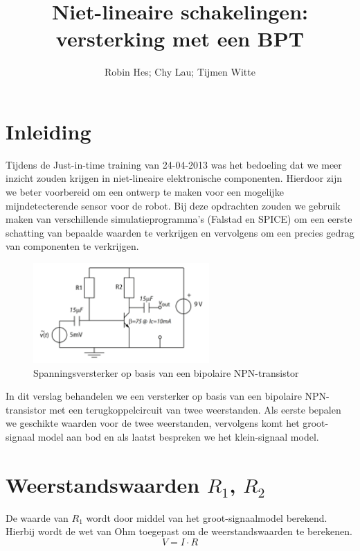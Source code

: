 \documentclass{report}
\title{Niet-lineaire schakelingen: versterking met een BPT}
\author{Robin Hes; Chy Lau; Tijmen Witte}
\begin{document}
\maketitle
\tableofcontents

\chapter{Inleiding}

Tijdens de Just-in-time training van 24-04-2013 was het bedoeling dat we meer inzicht zouden krijgen in niet-lineaire elektronische componenten. Hierdoor 
zijn we beter voorbereid om een ontwerp te maken voor een mogelijke mijndetecterende sensor voor de robot. Bij deze opdrachten zouden we gebruik maken van verschillende simulatieprogramma's (Falstad en SPICE) om een eerste schatting van bepaalde waarden te verkrijgen en vervolgens om een precies gedrag van componenten te verkrijgen.

\begin{figure}[H]
	\centering
	\label{fig:npn-amplifier}
	\includegraphics[width=0.6\textwidth]{resource/npn-amplifier}
	\caption{Spanningsversterker op basis van een bipolaire NPN-transistor \cite[p.~3]{epo2-non-linear}}
\end{figure}

\noindent
In dit verslag behandelen we een versterker op basis van een bipolaire NPN-transistor met een terugkoppelcircuit van twee weerstanden. Als eerste bepalen we geschikte waarden voor de twee weerstanden, vervolgens komt het groot-signaal model aan bod en als laatst bespreken we het klein-signaal model.

\chapter{Weerstandswaarden $R_1$, $R_2$}
De waarde van $R_1$ wordt door middel van het groot-signaalmodel berekend. Hierbij wordt de wet van Ohm toegepast om de weerstandswaarden te berekenen. 
\begin{equation}
V = I \cdot R 
\end{equation}
\end{document}
